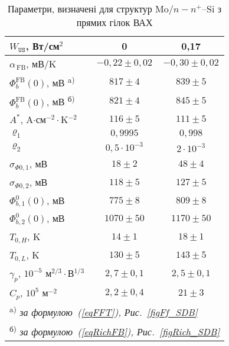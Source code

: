 \documentclass[a4paper,14pt,oneside,openany]{memoir}
\begin{document}
\begin{table}
\caption{Параметри, визначені для структур Mo$/n-n^+$--Si з прямих гілок ВАХ}
\label{tabSDBPar}
\centering
\begin{tabular}{|l|c|c|}
\hline
$W_\mathtt{US}$,  Вт/см$^2$ &0&0,17\\\hline
\hline
$\alpha_\mathrm{\,FB}$, мВ/K &$-0,22\pm0,02$&$-0,30\pm0,02$\\\hline
$\Phi_{b}^\mathrm{FB}(0)$, мВ \textsuperscript{ a)} &$817\pm4$ & $839\pm5$\\\hline
$\Phi_{b}^\mathrm{FB}(0)$, мВ \textsuperscript{ б)} &$821\pm4$ & $845\pm5$\\\hline
$A^*$, A$\cdot$см$^{-2}\cdot$K$^{-2}$ &$116\pm5$ & $111\pm5$\\\hline
$\varrho_1$ &$0,9995$ & $0,998$\\\hline
$\varrho_2$ &$0,5\cdot10^{-3}$ & $2\cdot10^{-3}$\\\hline
$\sigma_{\Phi0,1}$, мВ&$18\pm2$ & $48\pm4$\\\hline
$\sigma_{\Phi0,2}$, мВ&$118\pm5$ & $127\pm5$\\\hline
$\Phi_{b,1}^0(0)$, мВ&$775\pm8$ & $809\pm8$\\\hline
$\Phi_{b,2}^0(0)$, мВ&$1070\pm50$ & $1170\pm50$\\\hline
$T_{0,H}$, K&$14\pm1$&$18\pm1$\\\hline
$T_{0,L}$, K&$130\pm5$&$143\pm5$\\\hline
$\gamma_p$, $10^{-5}$ м$^{2/3}\cdot$В$^{1/3}$&$2,7\pm0,1$&$2,5\pm0,1$\\\hline
$C_p$, $10^{5}$ м$^{-2}$&$2,2\pm0,4$&$21\pm3$\\ \hline
\multicolumn{3}{l}{\textsuperscript{ a)} \emph{за формулою~(\ref{eqFFT}), Рис.~\ref{figFf_SDB} }}  \\
\multicolumn{3}{l}{\textsuperscript{ б)} \emph{за формулою~(\ref{eqRichFB}), Рис.~\ref{figRich_SDB} }} \\
\end{tabular}
\end{table}
\end{document}
